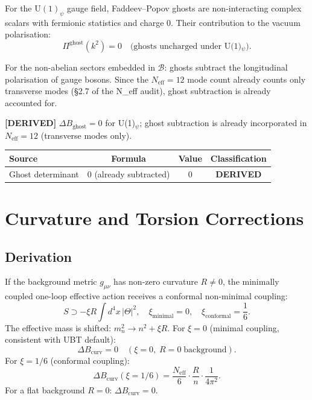 \documentclass[11pt,a4paper]{article}
\newcommand{\derived}[1]{\textbf{[DERIVED]} #1}
\begin{document}
For the $\mathrm{U}(1)_\psi$ gauge field, Faddeev--Popov ghosts are non-interacting
complex scalars with fermionic statistics and charge 0.  Their contribution to the
vacuum polarisation:
\begin{equation}
  \Pi^\mathrm{ghost}(k^2) = 0 \quad \text{(ghosts uncharged under U(1)$_\psi$)}.
\end{equation}

For the non-abelian sectors embedded in $\mathcal{B}$:
ghosts subtract the longitudinal polarisation of gauge bosons.  Since the
$N_\mathrm{eff} = 12$ mode count already counts only transverse modes (§2.7 of
the N\_eff audit), ghost subtraction is already accounted for.

\derived{$\Delta B_\mathrm{ghost} = 0$ for U(1)$_\psi$; ghost subtraction is
already incorporated in $N_\mathrm{eff} = 12$ (transverse modes only).}

\begin{center}
\begin{tabular}{lccc}
\toprule
Source & Formula & Value & Classification \\\midrule
Ghost determinant & 0 (already subtracted) & $0$ & \textbf{DERIVED} \\\bottomrule
\end{tabular}
\end{center}

\section{Curvature and Torsion Corrections}

\subsection{Derivation}

If the background metric $g_{\mu\nu}$ has non-zero curvature $R \neq 0$, the
minimally coupled one-loop effective action receives a conformal non-minimal coupling:
\begin{equation}
  S \supset -\xi R \int d^4x\,|\Theta|^2,
  \quad \xi_\mathrm{minimal} = 0,\quad \xi_\mathrm{conformal} = \frac{1}{6}.
\end{equation}
The effective mass is shifted: $m_n^2 \to n^2 + \xi R$.  For $\xi = 0$
(minimal coupling, consistent with UBT default):
\begin{equation}
  \Delta B_\mathrm{curv} = 0 \quad (\xi = 0,\; R = 0\;\text{background}).
\end{equation}
For $\xi = 1/6$ (conformal coupling):
\begin{equation}
  \Delta B_\mathrm{curv}(\xi=1/6)
  = \frac{N_\mathrm{eff}}{6}\cdot\frac{R}{n}\cdot\frac{1}{4\pi^2}.
\end{equation}
For a flat background $R = 0$: $\Delta B_\mathrm{curv} = 0$.
\end{document}
